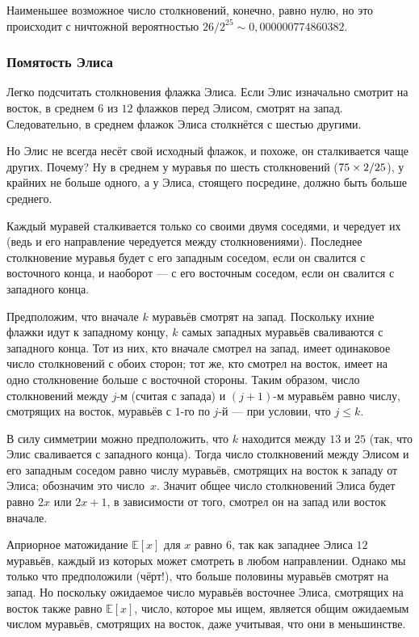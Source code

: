 Наименьшее возможное число столкновений, конечно, равно нулю, но это происходит с ничтожной вероятностью $26/2^{25} \sim 0{,}000000774860382$.


\subsubsection*{Помятость Элиса}

Легко подсчитать столкновения флажка Элиса.
Если Элис изначально смотрит на восток, в среднем $6$ из $12$ флажков перед Элисом, смотрят на запад.
Следовательно, в среднем  флажок Элиса столкнётся с шестью другими.

Но Элис не всегда несёт свой исходный флажок, и похоже, он сталкивается чаще других.
Почему?
Ну в среднем у муравья по шесть столкновений ($75 \z\times 2/25$), у крайних не больше одного, а у Элиса, стоящего посредине, должно быть больше среднего.

Каждый муравей сталкивается только со своими двумя соседями,
и чередует их (ведь и его направление чередуется между столкновениями).
Последнее столкновение муравья будет с его западным соседом, если он свалится с восточного конца, и наоборот --- с его восточным соседом, если он свалится с западного конца.

Предположим, что вначале $k$ муравьёв смотрят на запад.
Поскольку ихние флажки идут к западному концу, $k$ самых западных муравьёв сваливаются с западного конца.
Тот из них, кто вначале смотрел на запад, имеет одинаковое число столкновений с обоих сторон;
тот же, кто смотрел на восток, имеет на одно столкновение больше с восточной стороны.
Таким образом, число столкновений между $j$-м  (считая с запада) и 
$(j+1)$-м муравьём равно числу, смотрящих на восток, муравьёв с $1$-го по $j$-й --- при условии, что $j\le k$.

В силу симметрии можно предположить, что $k$ находится между $13$ и $25$ (так, что Элис сваливается с западного конца).
Тогда число столкновений между Элисом и его западным соседом равно числу муравьёв, смотрящих на восток к западу от Элиса; обозначим это число~$x$.
Значит общее число столкновений Элиса будет равно $2x$ или $2x+1$, в зависимости от того, смотрел он на запад или восток вначале.

Априорное матожидание $\mathbb{E}[x]$ для $x$ равно $6$, так как западнее Элиса $12$ муравьёв, каждый из которых может смотреть в любом направлении.
Однако мы только что предположили (чёрт!), что больше половины муравьёв смотрят на запад.
Но поскольку ожидаемое число муравьёв восточнее Элиса, смотрящих на восток также равно $\mathbb{E}[x]$, число, которое мы ищем, является общим ожидаемым числом муравьёв, смотрящих на восток, даже учитывая, что они в меньшинстве.

